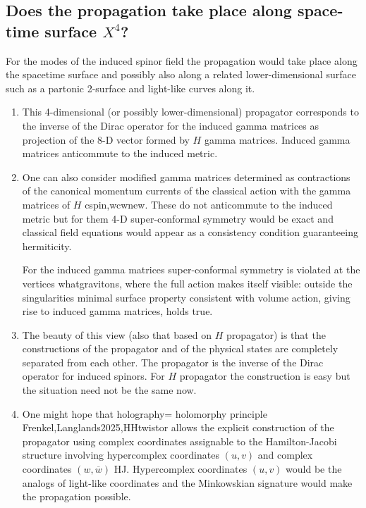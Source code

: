 \documentclass[10pt,epsf]{article}
\begin{document}
\subsection{Does the propagation take place along space-time surface $X^4$?} 

For the modes of the induced spinor field  the propagation would  take  place  along  the spacetime surface and  possibly also along  a related lower-dimensional surface such as a partonic 2-surface and light-like curves along it. 

\begin{enumerate}

\item    This 4-dimensional (or  possibly lower-dimensional) propagator corresponds to the inverse  of the Dirac operator for the induced gamma matrices  as projection of  the  8-D vector formed by $H$ gamma matrices. Induced gamma matrices anticommute to the induced metric. 

\item One can also consider   modified  gamma matrices determined as contractions of the canonical momentum currents of the classical action with the gamma matrices of $H$ \cite{allb}{cspin,wcwnew}. These  do not anticommute to the induced metric but for  them  4-D  super-conformal symmetry would be exact and classical field equations would appear as a consistency condition guaranteeing hermiticity. 

For the induced gamma matrices super-conformal symmetry is violated at the vertices \cite{btart}{whatgravitons}, where the full action makes itself visible: outside the singularities minimal surface property consistent with volume action, giving rise to induced gamma matrices, holds true. 

\item The beauty  of this view (also that based on $H$ propagator) is that the constructions of the propagator and  of  the physical states  are  completely separated from each other.    The propagator is the inverse of the Dirac operator for induced spinors. For $H$ propagator the construction is easy but the situation need not be  the same now.

\item One might hope that holography= holomorphy principle \cite{btart}{Frenkel,Langlands2025,HHtwistor}    allows the explicit construction  of the propagator using complex coordinates assignable to the Hamilton-Jacobi structure  involving hypercomplex  coordinates $(u,v)$   and   complex coordinates $(w,\overline{w})$ \cite{btart}{HJ}. Hypercomplex coordinates $(u,v)$   would be the analogs of light-like coordinates and the Minkowskian signature would  make  the propagation possible.  


\end{enumerate}
\end{document}
